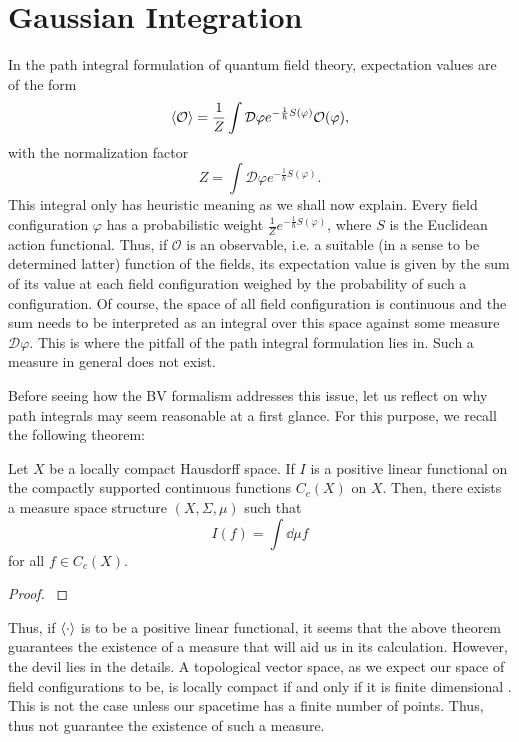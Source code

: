 \section{Gaussian Integration}

In the path integral formulation of quantum field theory, expectation values are of the form
\begin{equation}\label{eq:expectation}
\ev{\mathcal{O}}=\frac{1}{Z}\int\mathcal{D}\varphi e^{-\frac{1}{\hbar}S(\varphi)}\mathcal{O}(\varphi),
\end{equation}
with the normalization factor
\begin{equation}
Z=\int\mathcal{D}\varphi e^{-\frac{1}{\hbar}S(\varphi)}.
\end{equation}
This integral only has heuristic meaning as we shall now explain. Every field configuration $\varphi$ has a probabilistic weight $\frac{1}{Z}e^{-\frac{1}{\hbar}S(\varphi)}$, where $S$ is the Euclidean action functional. Thus, if $\mathcal{O}$ is an observable, i.e. a suitable (in a sense to be determined latter) function of the fields, its expectation value is given by the sum of its value at each field configuration weighed by the probability of such a configuration. Of course, the space of all field configuration is continuous and the sum needs to be interpreted as an integral over this space against some measure $\mathcal{D}\varphi$. This is where the pitfall of the path integral formulation lies in. Such a measure in general does not exist.

Before seeing how the BV formalism addresses this issue, let us reflect on why path integrals may seem reasonable at a first glance. For this purpose, we recall the following theorem:
\begin{theorem}
Let $X$ be a locally compact Hausdorff space. If $I$ is a positive linear functional on the compactly supported continuous functions $C_c(X)$ on $X$. Then, there exists a measure space structure $(X,\Sigma,\mu)$ such that
\begin{equation}
I(f)=\int\dd\mu f
\end{equation}
for all $f\in C_c(X)$.
\end{theorem}  
\begin{proof}
\cite[see][Theorem 12.36]{Hewitt1975}
\end{proof}
Thus, if $\ev{\cdot}$ is to be a positive linear functional, it seems that the above theorem guarantees the existence of a measure that will aid us in its calculation. However, the devil lies in the details. A topological vector space, as we expect our space of field configurations to be, is locally compact if and only if it is finite dimensional \cite[see][Theorems 1.21 and 1.22]{Rudin1991}. This is not the case unless our spacetime has a finite number of points. Thus,  thus not guarantee the existence of such a measure. 

